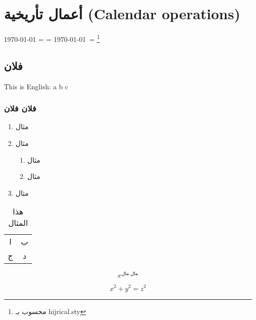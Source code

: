 \documentclass[a4paper]{book}%
\begin{document}
\section{أعمال تأريخية \textenglish{(Calendar operations)}}


\textenglish{\today} = \LR{\today} = \today\ = \Hijritoday\footnote{ 
	محسوب بـ \textenglish{\textsf{hijrical.sty}}} 

\subsection{فلان}
\textenglish{This is English: a b c} %

\subsubsection{فلان فلان}
\begin{enumerate}
	\item مثال
	\item مثال
		\begin{enumerate}
			\item مثال
			\item مثال
		\end{enumerate}

	\item مثال	
\end{enumerate}

\begin{table}[h]
	\centering
	\begin{tabular}{cc}
		ا & ب  \\
		ج & د  
	\end{tabular}
	\caption{هذا المثال}
\end{table}

\[
x^\text{مال مال}
\]

\begin{equation}
	x^2 + y^2 = z^2
	\label{test}
\end{equation}
\end{document}
